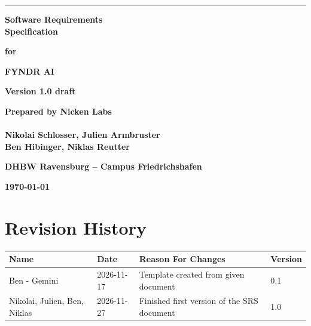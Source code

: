 \documentclass[11pt, a4paper]{article}
\newcommand{\projecttitle}{FYNDR AI}
\newcommand{\docversion}{Version 1.0 draft}
\newcommand{\docauthor}{Nicken Labs \\ \vspace{0.5em} \\ Nikolai Schlosser, Julien Armbruster\\ Ben Hibinger, Niklas Reutter}
\newcommand{\docorg}{DHBW Ravensburg -- Campus Friedrichshafen}
\newcommand{\docdate}{\today}
\begin{document}
\begin{titlepage}
    \sffamily
    \noindent\rule{\textwidth}{3pt}
    \vspace{1.2cm}
    
    \begin{flushright}
        {\fontsize{28}{34}\selectfont\bfseries Software Requirements\\Specification\par}
        \vspace{1.2cm}
        {\Large\bfseries for\par}
        \vspace{1.2cm}
        {\fontsize{24}{30}\selectfont\bfseries \projecttitle\par}
        \vspace{1.8cm}
        {\large\bfseries \docversion\par}
        \vspace{1.2cm}
        {\large\bfseries Prepared by \docauthor\par}
        \vspace{1.2cm}
        {\large\bfseries \docorg\par}
        \vspace{1.2cm}
        {\large\bfseries \docdate\par}
    \end{flushright}
\end{titlepage}

\setcounter{page}{2}

\renewcommand{\contentsname}{Table of Contents}
\tableofcontents

\vspace{1.2cm}
\section*{Revision History}

\begin{tabularx}{\textwidth}{|p{3.2cm}|p{2.4cm}|X|p{2.2cm}|}
    \hline
    \textbf{Name} & \textbf{Date} & \textbf{Reason For Changes} & \textbf{Version} \\
    \hline\hline
    Ben - Gemini & 2026-11-17 & Template created from given document & 0.1  \\
    \hline
    Nikolai, Julien, Ben, Niklas & 2026-11-27 & Finished first version of the SRS document & 1.0 \\
    \hline

\end{tabularx}
\end{document}
